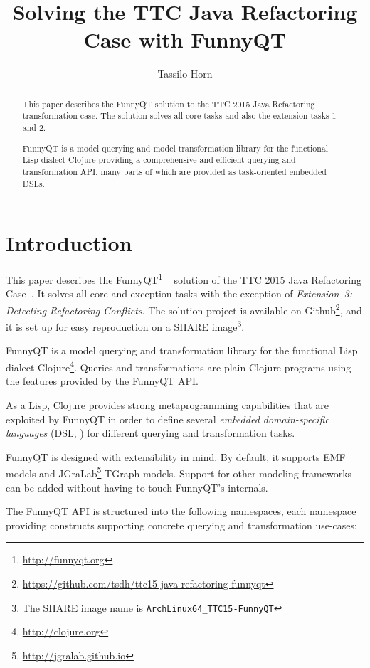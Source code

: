 \documentclass[submission]{eptcs}
\title{Solving the TTC Java Refactoring Case with FunnyQT}
\author{Tassilo Horn
  \institute{Institute for Software Technology, University Koblenz-Landau, Germany}
  \email{horn@uni-koblenz.de}}
\begin{document}
\maketitle

\begin{abstract}
  This paper describes the FunnyQT solution to the TTC 2015 Java Refactoring
  transformation case.  The solution solves all core tasks and also the
  extension tasks 1 and 2.

  FunnyQT is a model querying and model transformation library for the
  functional Lisp-dialect Clojure providing a comprehensive and efficient
  querying and transformation API, many parts of which are provided as
  task-oriented embedded DSLs.
\end{abstract}


\section{Introduction}
\label{sec:introduction}

This paper describes the FunnyQT\footnote{\url{http://funnyqt.org}}
~\cite{Horn2013MQWFQ,funnyqt-icgt15} solution of the TTC 2015 Java Refactoring
Case~\cite{java-refactoring-case-desc}.  It solves all core and exception tasks
with the exception of \emph{Extension~3: Detecting Refactoring Conflicts}.  The
solution project is available on
Github\footnote{\url{https://github.com/tsdh/ttc15-java-refactoring-funnyqt}},
and it is set up for easy reproduction on a SHARE image\footnote{The SHARE
  image name is \verb|ArchLinux64_TTC15-FunnyQT|}.

FunnyQT is a model querying and transformation library for the functional Lisp
dialect Clojure\footnote{\url{http://clojure.org}}.  Queries and
transformations are plain Clojure programs using the features provided by the
FunnyQT API.

As a Lisp, Clojure provides strong metaprogramming capabilities that are
exploited by FunnyQT in order to define several \emph{embedded domain-specific
  languages} (DSL, \cite{book:Fowler2010DSL}) for different querying and
transformation tasks.

FunnyQT is designed with extensibility in mind.  By default, it supports EMF
\cite{Steinberg2008EEM} models and
JGraLab\footnote{\url{http://jgralab.github.io}} TGraph models.  Support for
other modeling frameworks can be added without having to touch FunnyQT's
internals.

The FunnyQT API is structured into the following namespaces, each namespace
providing constructs supporting concrete querying and transformation use-cases:
\end{document}
